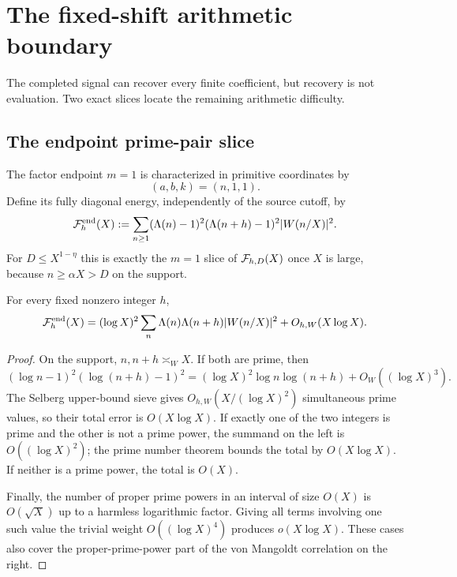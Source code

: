 \section{The fixed-shift arithmetic boundary}
\label{sec:fixed-shift-boundary}

The completed signal can recover every finite coefficient, but recovery
is not evaluation.  Two exact slices locate the remaining arithmetic
difficulty.

\subsection{The endpoint prime-pair slice}

The factor endpoint $m=1$ is characterized in primitive coordinates by
\[
 (a,b,k)=(n,1,1).
\]
Define its fully diagonal energy, independently of the source cutoff, by
\begin{equation}
 \mathcal F_h^{\rm end}(X)
 :=\sum_{n\geq1}
 (\Lambda(n)-1)^2(\Lambda(n+h)-1)^2
 |W(n/X)|^2.
 \label{eq:endpoint-energy}
\end{equation}
For $D\leq X^{1-\eta}$ this is exactly the $m=1$ slice of
$\mathcal F_{h,D}(X)$ once $X$ is large, because $n\geq\alpha X>D$ on the
support.

\begin{proposition}
\label{prop:endpoint-reduction}
For every fixed nonzero integer $h$,
\begin{equation}
 \mathcal F_h^{\rm end}(X)
 =(\log X)^2
 \sum_n\Lambda(n)\Lambda(n+h)|W(n/X)|^2
 +O_{h,W}(X\log X).
 \label{eq:endpoint-reduction}
\end{equation}
\end{proposition}

\begin{proof}
On the support, $n,n+h\asymp_WX$.  If both are prime, then
\[
 (\log n-1)^2(\log(n+h)-1)^2
 =(\log X)^2\log n\log(n+h)+O_W((\log X)^3).
\]
The Selberg upper-bound sieve gives
$O_{h,W}(X/(\log X)^2)$ simultaneous prime values, so their total error
is $O(X\log X)$.  If exactly one of the two integers is prime and the
other is not a prime power, the summand on the left is
$O((\log X)^2)$; the prime number theorem bounds the total by
$O(X\log X)$.  If neither is a prime power, the total is $O(X)$.

Finally, the number of proper prime powers in an interval of size
$O(X)$ is $O(\sqrt X)$ up to a harmless logarithmic factor.  Giving all
terms involving one such value the trivial weight $O((\log X)^4)$
produces $o(X\log X)$.  These cases also cover the proper-prime-power
part of the von Mangoldt correlation on the right.
\end{proof}

